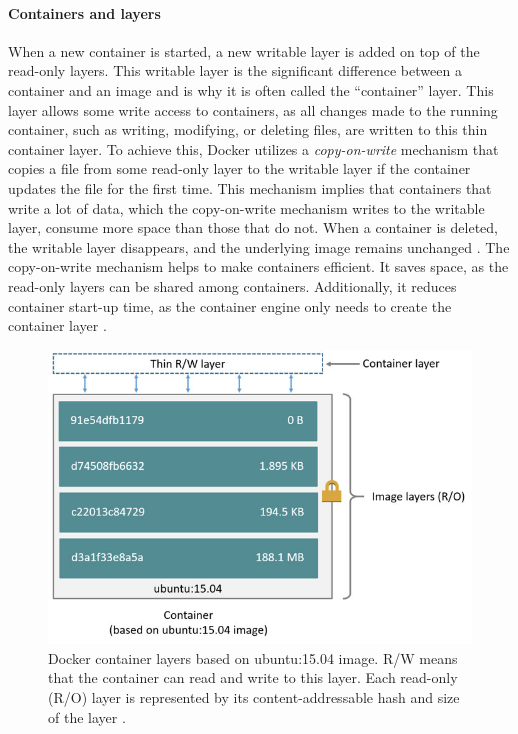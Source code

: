 \paragraph{Containers and layers}\label{containers-and-layers}
When a new container is started, a new writable layer is added on top of the read-only layers. This writable layer is the significant difference between a container and an image and is why it is often called the ``container'' layer. This layer allows some write access to containers, as all changes made to the running container, such as writing, modifying, or deleting files, are written to this thin container layer. To achieve this, Docker utilizes a \emph{copy-on-write} mechanism that copies a file from some read-only layer to the writable layer if the container updates the file for the first time. This mechanism implies that containers that write a lot of data, which the copy-on-write mechanism writes to the writable layer, consume more space than those that do not. When a container is deleted, the writable layer disappears, and the underlying image remains unchanged \cite{DockerStorageDrivers}. The copy-on-write mechanism helps to make containers efficient. It saves space, as the read-only layers can be shared among containers. Additionally, it reduces container start-up time, as the container engine only needs to create the container layer \cite{DockerStorageDrivers}.
\begin{figure}[h!]
  \centering
  \includegraphics[width=\textwidth]{thesis/graphics/container-layers.jpg}
  \caption{Docker container layers based on ubuntu:15.04 image. R/W means that the container can read and write to this layer. Each read-only (R/O) layer is represented by its content-addressable hash and size of the layer \cite{DockerStorageDrivers}.}
  \label{fig:container-layers}
\end{figure}

